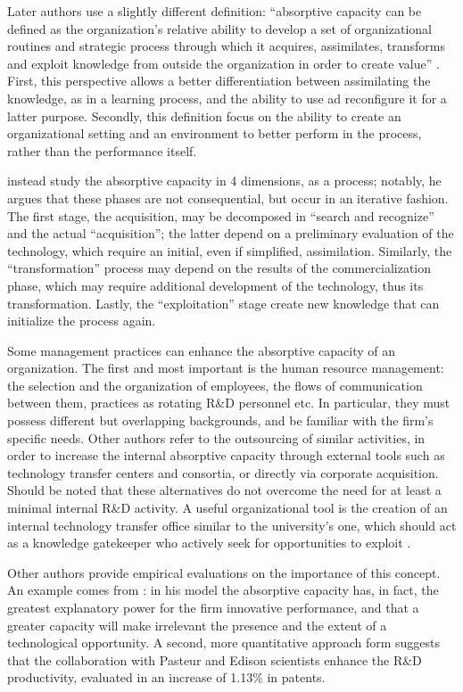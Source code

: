 Later authors use a slightly different definition: \enquote{absorptive capacity can be defined as the organization's relative ability to develop a set of organizational routines and strategic process through which it acquires, assimilates, transforms and exploit knowledge from outside the organization in order to create value} \citep{Jimenez2011}. First, this perspective allows a better differentiation between assimilating the knowledge, as in a learning process, and the ability to use ad reconfigure it for a latter purpose. Secondly, this definition focus on the ability to create an organizational setting and an environment to better perform in the process, rather than the performance itself. 

\citet{Patterson2015} instead study the absorptive capacity in 4 dimensions, as a process; notably, he argues that these phases are not consequential, but occur in an iterative fashion. The first stage, the acquisition, may be decomposed in \enquote{search and recognize} and the actual \enquote{acquisition}; the latter depend on a preliminary evaluation of the technology, which require an initial, even if simplified, assimilation. Similarly, the \enquote{transformation} process may depend on the results of the commercialization phase, which may require additional development of the technology, thus its transformation. Lastly, the \enquote{exploitation} stage create new knowledge that can initialize the process again. 

Some management practices can enhance the absorptive capacity of an organization. The first and most important is the human resource management: the selection and the organization of employees, the flows of communication between them, practices as rotating R\&D personnel etc. In particular, they must possess different but overlapping backgrounds, and be familiar with the firm's specific needs. Other authors refer to the outsourcing of similar activities, in order to increase the internal absorptive capacity through external tools such as technology transfer centers and consortia, or directly via corporate acquisition. Should be noted that these alternatives do not overcome the need for at least a minimal internal R\&D activity. A useful organizational tool is the creation of an internal technology transfer office similar to the university's one, which should act as a knowledge gatekeeper who actively seek for opportunities to exploit \citep{Alexander2013}.

Other authors provide empirical evaluations on the importance of this concept. An example comes from \citet{Nieto2005}: in his model the absorptive capacity has, in fact, the greatest explanatory power for the firm innovative performance, and that a greater capacity will make irrelevant the presence and the extent of a technological opportunity. A second, more quantitative approach form \citet{Baba2009} suggests that the collaboration with Pasteur and Edison scientists enhance the R\&D productivity, evaluated in an increase of 1.13\% in patents.

